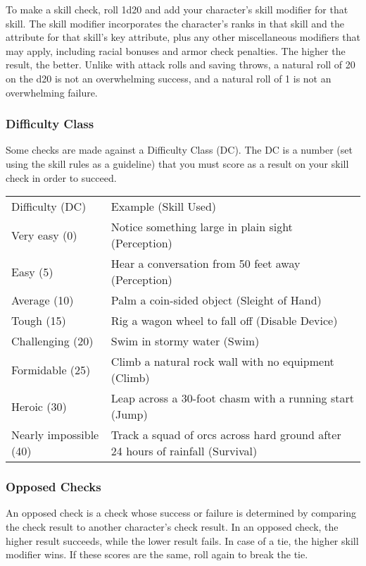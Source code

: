 To make a skill check, roll 1d20 and add your character's skill modifier for that skill. The skill modifier incorporates the character's ranks in that skill and the attribute for that skill's key attribute, plus any other miscellaneous modifiers that may apply, including racial bonuses and armor check penalties. The higher the result, the better. Unlike with attack rolls and saving throws, a natural roll of 20 on the d20 is not an overwhelming success, and a natural roll of 1 is not an overwhelming failure.

\subsubsection{Difficulty Class}
Some checks are made against a Difficulty Class (DC). The DC is a number (set using the skill rules as a guideline) that you must score as a result on your skill check in order to succeed.

\begin{dtable}
\begin{tabularx}{\columnwidth}{p{8em} X}
Difficulty (DC) & Example (Skill Used) \\
Very easy (0) & Notice something large in plain sight (Perception) \\
Easy (5) & Hear a conversation from 50 feet away (Perception) \\
Average (10) & Palm a coin-sided object (Sleight of Hand) \\
Tough (15) & Rig a wagon wheel to fall off (Disable Device) \\
Challenging (20) & Swim in stormy water (Swim) \\
Formidable (25) & Climb a natural rock wall with no equipment (Climb) \\
Heroic (30) & Leap across a 30-foot chasm with a running start (Jump) \\
Nearly impossible (40) & Track a squad of orcs across hard ground after 24 hours of rainfall (Survival) \\
\end{tabularx}
\end{dtable}

\subsubsection{Opposed Checks}
An opposed check is a check whose success or failure is determined by comparing the check result to another character's check result. In an opposed check, the higher result succeeds, while the lower result fails. In case of a tie, the higher skill modifier wins. If these scores are the same, roll again to break the tie.

